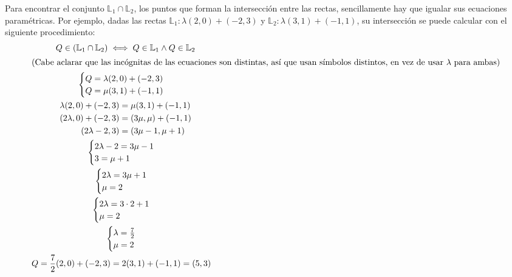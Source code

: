 \documentclass[../teoria.root.tex]{subfiles}
\begin{document}
Para encontrar el conjunto $\mathbb{L}_1\cap\mathbb{L}_2$, los puntos que
forman la intersección entre las rectas, sencillamente hay que igualar sus
ecuaciones paramétricas. Por ejemplo, dadas las rectas
$\mathbb{L}_1:\lambda(2,0)+(-2,3)$ y $\mathbb{L}_2:\lambda(3,1)+(-1,1)$, su
intersección se puede calcular con el siguiente procedimiento:
\begin{gather*}
	\begin{split}
		Q\in(\mathbb{L}_1\cap\mathbb{L}_2)\iff Q\in\mathbb{L}_1\land Q\in\mathbb{L}_2
	\end{split}\\
	\intertext{(Cabe aclarar que las incógnitas de las ecuaciones son
	distintas, así que usan símbolos distintos, en vez de usar $\lambda$ para
	ambas)}
	\begin{cases}
		Q=\lambda(2,0)+(-2,3)\\
		Q=\mu(3,1)+(-1,1)
	\end{cases}\\
	\begin{split}
		\lambda(2,0)+(-2,3)&=\mu(3,1)+(-1,1)\\
		(2\lambda,0)+(-2,3)&=(3\mu,\mu)+(-1,1)\\
		(2\lambda-2,3)&=(3\mu-1,\mu+1)
	\end{split}\\
	\begin{cases}
		2\lambda-2=3\mu-1\\
		3=\mu+1
	\end{cases}\\
	\begin{cases}
		2\lambda=3\mu+1\\
		\mu=2
	\end{cases}\\
	\begin{cases}
		2\lambda=3\cdot2+1\\
		\mu=2
	\end{cases}\\
	\begin{cases}
		\lambda=\frac{7}{2}\\
		\mu=2
	\end{cases}\\
	\begin{split}
		Q=\frac{7}{2}(2,0)+(-2,3)&=2(3,1)+(-1,1)=(5,3)
	\end{split}
\end{gather*}
\end{document}

